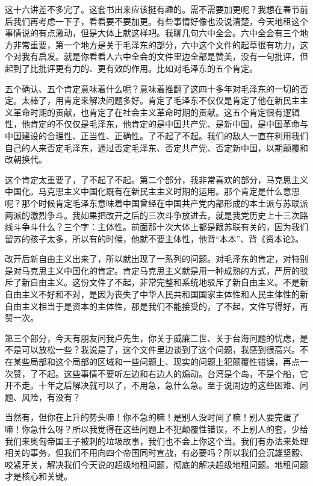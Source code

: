 \documentclass[UTF8, 12pt, a4paper]{ctexrep}
\begin{document}
这十六讲差不多完了。这套书出来应该挺有趣的。需不需要加更呢？我想在春节前后我们再考虑一下子，看看要不要加更。有些事情好像也没说清楚，今天地租这个事情说的有点激动，但是大体上就这样吧。我聊几句六中全会。六中全会有三个地方非常重要，第一个地方是关于毛泽东的部分，六中这个文件的起草很有功力，这个对我有启发。就是你看看人六中全会的文件里边全部是赞美，没有一句批评，但起到了比批评更有力的、更有效的作用。比如对毛泽东的五个肯定。

五个确认、五个肯定意味着什么呢？意味着推翻了这四十多年对毛泽东的一切的否定。太棒了，用肯定来解决问题多好。肯定了毛泽东不仅仅是肯定了他在新民主主义革命时期的贡献，也肯定了在社会主义革命时期的贡献。这五个肯定很有逻辑性，他肯定的不仅仅是毛泽东，他肯定的是中国共产党、是新中国，是中国革命与中国建设的合理性、正当性、正确性。了不起了不起。我们的敌人一直在利用我们自己的人来否定毛泽东，通过否定毛泽东、否定共产党、否定新中国，以期颠覆和改朝换代。

这个肯定太重要了，了不起了不起。第二个部分，我非常喜欢的部分，马克思主义中国化。马克思主义中国化既有在新民主主义时期的运用。那个肯定是什么意思呢？那个时候肯定毛泽东意味着中国曾经在中国共产党内部形成的本土派与苏联派两派的激烈争斗。我如果把改开之后的三次斗争放进去，就是我党历史上十三次路线斗争斗什么？三个字：主体性。前面那十次大体上都是跟苏联有关的，因为我们留苏的孩子太多，所以有的时候，他就不要主体性，他背“本本”、背《资本论》。

改开后新自由主义出来了，所以就出现了一系列的问题。对毛泽东的肯定，对特别是对马克思主义中国化的肯定。肯定马克思主义就是用一种成熟的方式，严厉的驳斥了新自由主义。这份文件了不起，非常完整和系统地驳斥了新自由主义。不是新自由主义不好和不对，是因为丧失了中华人民共和国国家主体性和人民主体性的新自由主义相当于是资本的主体性，那是我们不能接受的，了不起，文件写得好，再赞一次。

第三个部分，今天有朋友问我卢先生，你关于威廉二世、关于台海问题的忧虑，是不是可以放松一些？我说是了，这个文件里边谈到了这个问题，我感到很高兴。不在某些局部和这个局部的区域和一些问题上、现实的问题上犯颠覆性错误，再点一次赞，了不起。这些事情不要听左边和右边人的煽动。台湾是个岛，不是个船，它开不走。十年之后解决就可以了，不用急，急什么急。至于说周边的这些困难、问题、风险，有没有？

当然有，但你在上升的势头嘛！你不急的嘛！是别人没时间了嘛！别人要完蛋了嘛！你急什么呀？所以我觉得在这些问题上不犯颠覆性错误，不上别人的套，少给我们来奥匈帝国王子被刺的垃圾故事，我们也不会上你这个当。我们有办法来处理相关的事务，但我们不用向四个帝国同时宣战，有必要吗？所以我们会沉雄坚毅、咬紧牙关，解决我们今天说的超级地租问题，彻底的解决超级地租问题。地租问题才是核心和关键。
\end{document}
